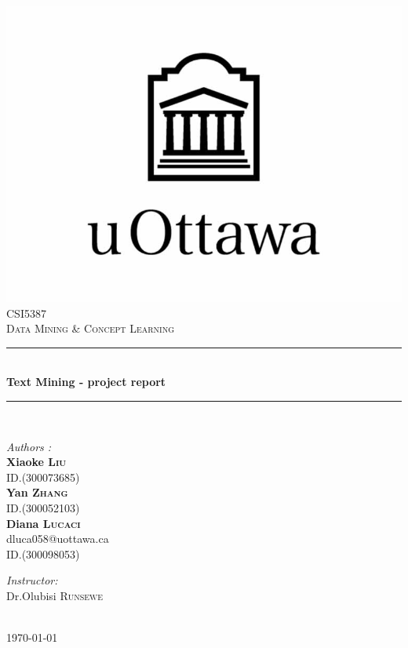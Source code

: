 \documentclass[10pt]{article}
\begin{document}
\begin{titlepage}
\newcommand{\HRule}{\rule{\linewidth}{0.1mm}} 
\center %

\includegraphics[width=.5\linewidth]{uottawa_logo.jpg}\\[0.5cm] 
\textsc{\Large CSI5387}\\[0.5cm] %
\textsc{\Large Data Mining \& Concept Learning}\\[0.5cm] %

\HRule \\[0.4cm]
{\huge\bfseries Text Mining - project report}\\[0.1cm] %
\HRule \\[1.5cm]
 

\begin{minipage}{0.4\textwidth}
\begin{flushleft} \large
\emph{Authors :}\\\textbf{Xiaoke \textsc{Liu}}\\ID.(300073685)
\\\textbf{Yan \textsc{Zhang}}\\ID.(300052103)
\\\textbf{Diana \textsc{Lucaci}}\\dluca058@uottawa.ca\\ID.(300098053)
\end{flushleft}
\end{minipage}
\begin{minipage}{0.4\textwidth}
\begin{flushright} \large
\emph{Instructor:} \\
Dr.Olubisi \textsc{Runsewe}\\
\end{flushright}
\end{minipage}\\[1cm]
{\large \today}\\[1cm]


\end{titlepage}
\end{document}
